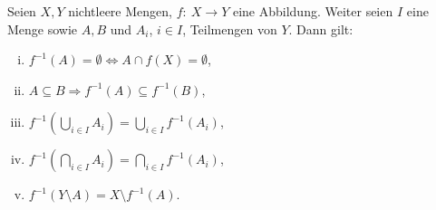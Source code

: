 \begin{proof*}
\end{proof*}


\begin{theorem}
Seien $X,Y$ nichtleere Mengen, $f\!:\ X \to Y$ eine Abbildung.
Weiter seien $I$ eine Menge sowie $A,B$ und $A_i$, $i \in I$, Teilmengen von $Y$.
Dann gilt:

\begin{enumerate}[(i)]
\item $f^{-1}(A) = \emptyset \iff A \cap f(X) = \emptyset$,
\item $A \subseteq B \Rightarrow f^{-1}(A) \subseteq f^{-1}(B)$,
\item $f^{-1}(\bigcup_{i \in I}A_i) = \bigcup_{i \in I}f^{-1}(A_i)$,
\item $f^{-1}(\bigcap_{i \in I}A_i) = \bigcap_{i \in I}f^{-1}(A_i)$,
\item $f^{-1}(Y \setminus A) = X \setminus f^{-1}(A)$.
\end{enumerate}
\end{theorem}

\begin{proof*}
\end{proof*}
